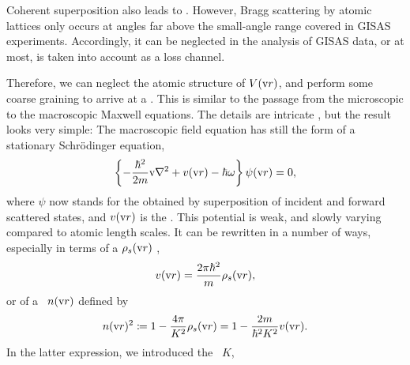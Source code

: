 Coherent superposition also leads to .
%
However, Bragg scattering by atomic lattices only occurs at angles
far above the small-angle range covered in GISAS experiments.
Accordingly, it can be neglected in the analysis of GISAS data,
or at most, is taken into account as a loss channel.

Therefore,
we can neglect the atomic structure of $V(\text{v}{r})$,
and perform some coarse graining to
arrive at a .
%
This is
similar to the passage from
the microscopic to the macroscopic Maxwell equations.
The details are intricate \cite{Sea89,Lax51},
but the result \cite[eq.~2.8.32]{Sea89} looks very simple:
The macroscopic field equation
has still the form of a stationary Schrödinger equation,
%
\begin{equation}\label{EmacrSchrodi}
  \left\{-\frac{\hbar^2}{2m}\text{v}{\nabla}^2+v(\text{v}{r})-\hbar\omega\right\} \psi(\text{v}{r}) = 0,
\end{equation}
%
%
where $\psi$ now stands for the 
%
%
obtained by superposition of
incident and forward scattered states,
and $v(\text{v}{r})$ is the .
%
This potential is weak, and slowly varying compared to atomic length scales.
It can be rewritten in a number of ways,
especially in terms of a
%
$\rho_s(\text{v}{r})$ \cite[eq.\ 2.8.37]{Sea89},
%
\begin{equation}
  v(\text{v}{r})=\frac{2\pi \hbar^2}{m}\rho_s(\text{v}{r}),
\end{equation}
or of a ~$n(\text{v}{r})$
%
%
defined by
\begin{equation}\label{EnRefrIndx}
  n(\text{v}{r})^2\coloneqq 1-\frac{4\pi}{K^2}\rho_s(\text{v}{r}) = 1 -\frac{2m}{\hbar^2 K^2}v(\text{v}{r}).
\end{equation}
In the latter expression,
we introduced the ~$K$,
%
